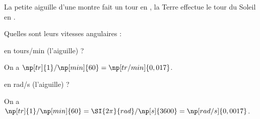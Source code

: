 
\hauteurLargeurCadreReponse		{6mm}{2cm}
\initialisationEntrainement

\smallskip

La petite aiguille d’une montre fait un tour en , la Terre effectue le tour du Soleil en . 

\medskip

Quelles sont leurs vitesses angulaires :

\debutEntrainement


\begin{enonce}
en tours/min (l'aiguille) ?
\end{enonce}


\begin{corrige}
On a $\np[tr]{1}/\np[min]{60}=\np[tr/min]{0,017}$.
\end{corrige}




\begin{enonce}
en rad/s (l'aiguille) ?
\end{enonce}


\begin{corrige}
On a $\np[tr]{1}/\np[min]{60}= \SI{2\pi}{rad} /\np[s]{3600} = \np[rad/s]{0,0017}$.
\end{corrige}

